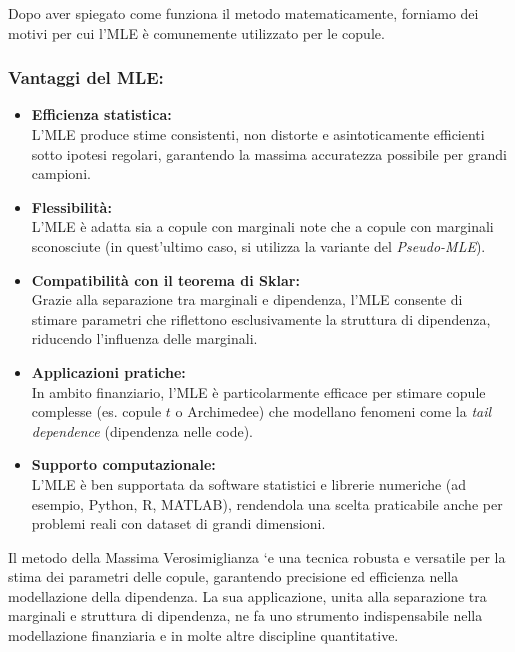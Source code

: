 \documentclass[%
	corpo=11pt,
    twoside,
    stile=classica,
    oldstyle,
    tipotesi=custom,
    greek,
    evenboxes,
]{toptesi}
\begin{document}
Dopo aver spiegato come funziona il metodo matematicamente, forniamo dei motivi per cui l'MLE è comunemente utilizzato per le copule.

\subsubsection{Vantaggi del MLE:}

\begin{itemize}
	\item \textbf{Efficienza statistica:}\\
	L'MLE produce stime consistenti, non distorte e asintoticamente efficienti sotto ipotesi regolari, garantendo la massima accuratezza possibile per grandi campioni.
	
	\item \textbf{Flessibilità:}\\
	L'MLE è adatta sia a copule con marginali note che a copule con marginali sconosciute (in quest'ultimo caso, si utilizza la variante del \textit{Pseudo-MLE}).
	
	\item \textbf{Compatibilità con il teorema di Sklar:}\\
	Grazie alla separazione tra marginali e dipendenza, l'MLE consente di stimare parametri che riflettono esclusivamente la struttura di dipendenza, riducendo l'influenza delle marginali.
	
	\item \textbf{Applicazioni pratiche:}\\
	In ambito finanziario, l'MLE è particolarmente efficace per stimare copule complesse (es. copule \(t\) o Archimedee) che modellano fenomeni come la \textit{tail dependence} (dipendenza nelle code).
	
	\item \textbf{Supporto computazionale:}\\
	L'MLE è ben supportata da software statistici e librerie numeriche (ad esempio, Python, R, MATLAB), rendendola una scelta praticabile anche per problemi reali con dataset di grandi dimensioni.
\end{itemize}

Il metodo della Massima Verosimiglianza `e una tecnica robusta e versatile per la stima dei parametri delle copule, garantendo precisione
ed efficienza nella modellazione della dipendenza. La sua applicazione,
unita alla separazione tra marginali e struttura di dipendenza, ne fa
uno strumento indispensabile nella modellazione finanziaria e in molte
altre discipline quantitative.\\
\end{document}

